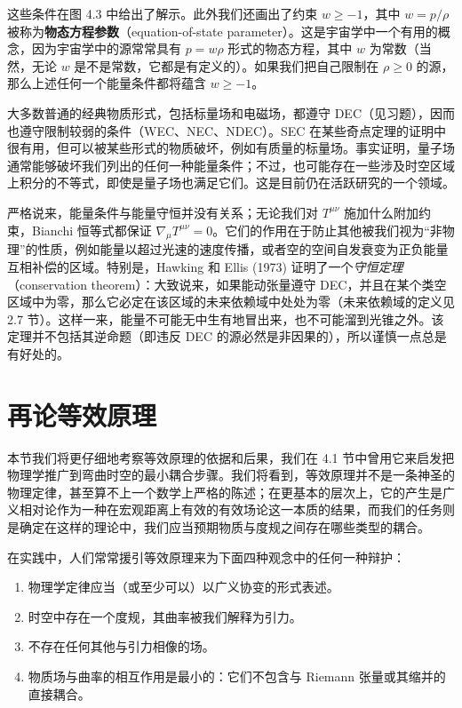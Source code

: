 这些条件在图 4.3 中给出了解示。此外我们还画出了约束 $w \geq -1$，其中 $w = p/\rho$ 被称为\textbf{物态方程参数}（equation-of-state parameter）。这是宇宙学中一个有用的概念，因为宇宙学中的源常常具有 $p = w\rho$ 形式的物态方程，其中 $w$ 为常数（当然，无论 $w$ 是不是常数，它都是有定义的）。如果我们把自己限制在 $\rho \geq 0$ 的源，那么上述任何一个能量条件都将蕴含 $w \geq -1$。


大多数普通的经典物质形式，包括标量场和电磁场，都遵守 DEC（见习题），因而也遵守限制较弱的条件（WEC、NEC、NDEC）。SEC 在某些奇点定理的证明中很有用，但可以被某些形式的物质破坏，例如有质量的标量场。事实证明，量子场通常能够破坏我们列出的任何一种能量条件；不过，也可能存在一些涉及时空区域上积分的不等式，即使是量子场也满足它们。这是目前仍在活跃研究的一个领域。

严格说来，能量条件与能量守恒并没有关系；无论我们对 $T^{\mu\nu}$ 施加什么附加约束，Bianchi 恒等式都保证 $\nabla_\mu T^{\mu\nu} = 0$。它们的作用在于防止其他被我们视为“非物理”的性质，例如能量以超过光速的速度传播，或者空的空间自发衰变为正负能量互相补偿的区域。特别是，Hawking 和 Ellis (1973) 证明了一个\emph{守恒定理}（conservation theorem）：大致说来，如果能动张量遵守 DEC，并且在某个类空区域中为零，那么它必定在该区域的未来依赖域中处处为零（未来依赖域的定义见 2.7 节）。这样一来，能量不可能无中生有地冒出来，也不可能溜到光锥之外。该定理并不包括其逆命题（即违反 DEC 的源必然是非因果的），所以谨慎一点总是有好处的。

\section{再论等效原理}

本节我们将更仔细地考察等效原理的依据和后果，我们在 4.1 节中曾用它来启发把物理学推广到弯曲时空的最小耦合步骤。我们将看到，等效原理并不是一条神圣的物理定律，甚至算不上一个数学上严格的陈述；在更基本的层次上，它的产生是广义相对论作为一种在宏观距离上有效的有效场论这一本质的结果，而我们的任务则是确定在这样的理论中，我们应当预期物质与度规之间存在哪些类型的耦合。

在实践中，人们常常援引等效原理来为下面四种观念中的任何一种辩护：
\begin{enumerate}
\item 物理学定律应当（或至少可以）以广义协变的形式表述。
\item 时空中存在一个度规，其曲率被我们解释为引力。
\item 不存在任何其他与引力相像的场。
\item 物质场与曲率的相互作用是最小的：它们不包含与 Riemann 张量或其缩并的直接耦合。
\end{enumerate}

